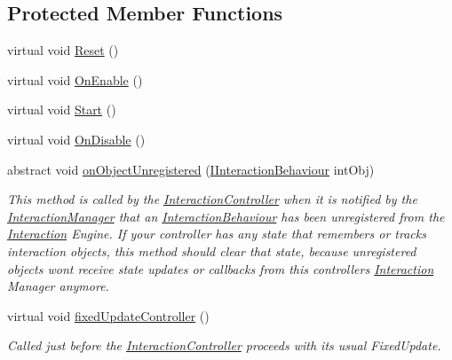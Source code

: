 \subsection*{Protected Member Functions}
\begin{DoxyCompactItemize}
\item 
virtual void \mbox{\hyperlink{class_leap_1_1_unity_1_1_interaction_1_1_interaction_controller_a593d87fbcfe464b2308a56a60b4796d5}{Reset}} ()
\item 
virtual void \mbox{\hyperlink{class_leap_1_1_unity_1_1_interaction_1_1_interaction_controller_a885d51f3ef8f88ce9be49f77fb9b1198}{On\+Enable}} ()
\item 
virtual void \mbox{\hyperlink{class_leap_1_1_unity_1_1_interaction_1_1_interaction_controller_a697f206b8e73d177c203b3ca12874cb6}{Start}} ()
\item 
virtual void \mbox{\hyperlink{class_leap_1_1_unity_1_1_interaction_1_1_interaction_controller_a426c454683c1da5fefe1469a5f0f29e4}{On\+Disable}} ()
\item 
abstract void \mbox{\hyperlink{class_leap_1_1_unity_1_1_interaction_1_1_interaction_controller_a0798edd8ad92d6b7f6229e3d9ac26d07}{on\+Object\+Unregistered}} (\mbox{\hyperlink{interface_leap_1_1_unity_1_1_interaction_1_1_i_interaction_behaviour}{I\+Interaction\+Behaviour}} int\+Obj)
\begin{DoxyCompactList}\small\item\em This method is called by the \mbox{\hyperlink{class_leap_1_1_unity_1_1_interaction_1_1_interaction_controller}{Interaction\+Controller}} when it is notified by the \mbox{\hyperlink{class_leap_1_1_unity_1_1_interaction_1_1_interaction_manager}{Interaction\+Manager}} that an \mbox{\hyperlink{class_leap_1_1_unity_1_1_interaction_1_1_interaction_behaviour}{Interaction\+Behaviour}} has been unregistered from the \mbox{\hyperlink{namespace_leap_1_1_unity_1_1_interaction}{Interaction}} Engine. If your controller has any state that remembers or tracks interaction objects, this method should clear that state, because unregistered objects won\textquotesingle{}t receive state updates or callbacks from this controller\textquotesingle{}s \mbox{\hyperlink{namespace_leap_1_1_unity_1_1_interaction}{Interaction}} Manager anymore. \end{DoxyCompactList}\item 
virtual void \mbox{\hyperlink{class_leap_1_1_unity_1_1_interaction_1_1_interaction_controller_ad66e5a09bdbe3e9573a504734bbc34f8}{fixed\+Update\+Controller}} ()
\begin{DoxyCompactList}\small\item\em Called just before the \mbox{\hyperlink{class_leap_1_1_unity_1_1_interaction_1_1_interaction_controller}{Interaction\+Controller}} proceeds with its usual Fixed\+Update. \end{DoxyCompactList}\item 

\end{DoxyCompactItemize}

